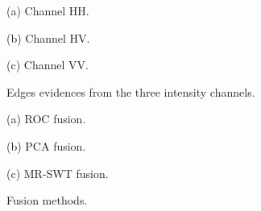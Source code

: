 \documentclass{article}
\begin{document}
\begin{figure}[hbt]
    \begin{minipage}{0.5\textwidth}
       \begin{minipage}[b]{.32\linewidth}
  \centering
 \centerline{}
  \vspace{-0.1cm}
  \centerline{\small{(a) Channel HH.}}\medskip
\end{minipage}
\begin{minipage}[b]{.31\linewidth}
  \centering
\centerline{}
  \vspace{-0.1cm}
  \centerline{\small{(b) Channel HV.}}\medskip
\end{minipage}
\begin{minipage}[b]{0.31\linewidth}
  \centering
 \centerline{}
  \vspace{-0.1cm}
  \centerline{\small{(c) Channel VV.}}\medskip
\end{minipage}\vspace{-0.3cm}
       \caption{Edges evidences from the three intensity channels.}
\label{fig:res}
    \end{minipage}%
\end{figure}
\vspace{-0.4cm}
\begin{figure}[hbt]
    \begin{minipage}{0.5\textwidth}
       \begin{minipage}[b]{.32\linewidth}
  \centering
 \centerline{}
  \vspace{-0.1cm}
  \centerline{\small{(a) ROC fusion.}}\medskip
\end{minipage}
\begin{minipage}[b]{.31\linewidth}
  \centering
\centerline{}
  \vspace{-0.1cm}
  \centerline{\small{(b) PCA fusion.}}\medskip
\end{minipage}
\begin{minipage}[b]{0.31\linewidth}
 \centerline{}
  \vspace{-0.1cm}
  \centerline{\small{(c) MR-SWT fusion.}}\medskip
\end{minipage}\vspace{-0.3cm}
       \caption{Fusion methods.}
\label{fig:fus}
    \end{minipage}%
\end{figure}
\end{document}
